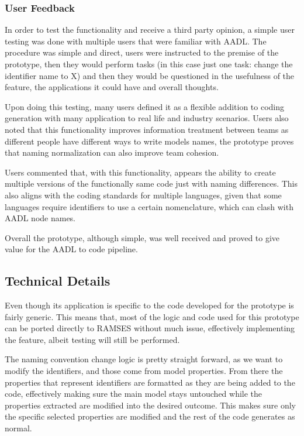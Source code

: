 \subsubsection{User Feedback}

In order to test the functionality and receive a third party opinion, a simple user testing was done with multiple users that were familiar with AADL. The procedure was simple and direct, users were instructed to the premise of the prototype, then they would perform tasks (in this case just one task: change the identifier name to X) and then they would be questioned in the usefulness of the feature, the applications it could have and overall thoughts.

Upon doing this testing, many users defined it as a flexible addition to coding generation with many application to real life and industry scenarios. Users also noted that this functionality improves information treatment between teams as different people have different ways to write models names, the prototype proves that naming normalization can also improve team cohesion.

Users commented that, with this functionality, appears the ability to create multiple versions of the functionally same code just with naming differences. This also aligns with the coding standards for multiple languages, given that some languages require identifiers to use a certain nomenclature, which can clash with AADL node names.

Overall the prototype, although simple, was well received and proved to give value for the AADL to code pipeline.

\subsection{Technical Details}
\label{sec:prototype_technical_details}

Even though its application is specific to the code developed for the prototype is fairly generic. This means that, most of the logic and code used for this prototype can be ported directly to RAMSES without much issue, effectively implementing the feature, albeit testing will still be performed.

The naming convention change logic is pretty straight forward, as we want to modify the identifiers, and those come from model properties. From there the properties that represent identifiers are formatted as they are being added to the code, effectively making sure the main model stays untouched while the properties extracted are modified into the desired outcome. This makes sure only the specific selected properties are modified and the rest of the code generates as normal.

